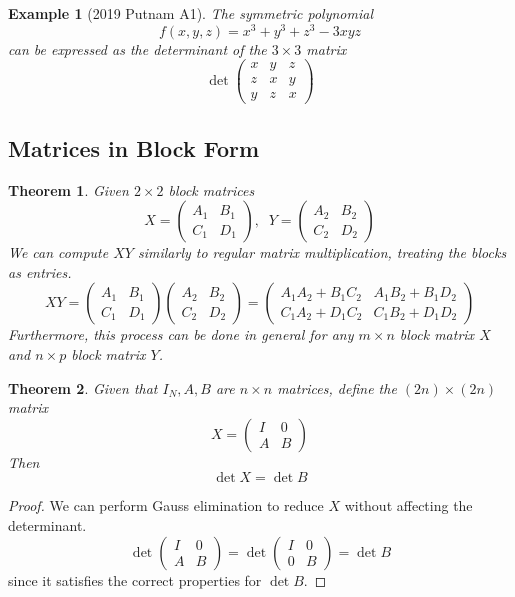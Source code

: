 \documentclass{article}
\newtheorem{theorem}{Theorem}[section]
\newtheorem{example}{Example}[section]
\theoremstyle{remark}
\theoremstyle{definition}
\begin{document}
\begin{example}[2019 Putnam A1]
The symmetric polynomial 
\[ f(x, y, z) = x^3 + y^3 + z^3 - 3 x y z\]
can be expressed as the determinant of the $3 \times 3$ matrix
\[\det{\begin{pmatrix}
x&y&z\\
z&x&y\\
y&z&x
\end{pmatrix}}\]
\end{example}

\subsection{Matrices in Block Form}
\begin{theorem}
Given $2 \times 2$ block matrices
\[X = \begin{pmatrix}
A_1&B_1\\C_1&D_1
\end{pmatrix}, \; \; Y = \begin{pmatrix}
A_2&B_2\\C_2&D_2
\end{pmatrix}\]
We can compute $X Y$ similarly to regular matrix multiplication, treating the blocks as entries. 
\[ X Y = \begin{pmatrix}
A_1&B_1\\C_1&D_1
\end{pmatrix} \begin{pmatrix}
A_2&B_2\\C_2&D_2
\end{pmatrix} = \begin{pmatrix}
A_1 A_2 + B_1 C_2 & A_1 B_2 + B_1 D_2 \\
C_1 A_2 + D_1 C_2 & C_1 B_2 + D_1 D_2 
\end{pmatrix}\]
Furthermore, this process can be done in general for any $m \times n$ block matrix $X$ and $n \times p$ block matrix $Y$. 
\end{theorem}

\begin{theorem}
Given that $I_N, A, B$ are $n \times n$ matrices, define the $(2n) \times (2n)$ matrix 
\[X = \begin{pmatrix}
I & 0 \\ A & B
\end{pmatrix}\]
Then 
\[\det{X} = \det{B}\]
\end{theorem}
\begin{proof}
We can perform Gauss elimination to reduce $X$ without affecting the determinant.
\[\det{\begin{pmatrix}
I&0\\A&B
\end{pmatrix}} = \det{
\begin{pmatrix}
I&0\\
0&B
\end{pmatrix}} = \det{B}\]
since it satisfies the correct properties for $\det{B}$. 
\end{proof}
\end{document}
